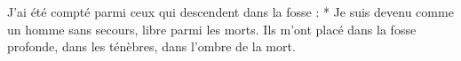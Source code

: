J'ai été compté parmi ceux qui descendent dans la fosse :
* Je suis devenu comme un homme sans secours, libre parmi les morts.
\versseparator
Ils m'ont placé dans la fosse profonde, dans les ténèbres, dans l'ombre de la mort.